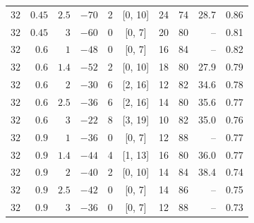 \begin{table}[t]
\begin{tabular}{rrrrrcrrrr}
$32$ & $0.45$ & $2.5$ & $-70$ & 2 & [0, 10] & 24 & 74 & 28.7 & 0.86 \\
$32$ & $0.45$ & $3$ & $-60$ & 0 & [0, 7] & 20 & 80 & -- & 0.81 \\
$32$ & $0.6$ & $1$ & $-48$ & 0 & [0, 7] & 16 & 84 & -- & 0.82 \\
$32$ & $0.6$ & $1.4$ & $-52$ & 2 & [0, 10] & 18 & 80 & 27.9 & 0.79 \\
$32$ & $0.6$ & $2$ & $-30$ & 6 & [2, 16] & 12 & 82 & 34.6 & 0.78 \\
$32$ & $0.6$ & $2.5$ & $-36$ & 6 & [2, 16] & 14 & 80 & 35.6 & 0.77 \\
$32$ & $0.6$ & $3$ & $-22$ & 8 & [3, 19] & 10 & 82 & 35.0 & 0.76 \\
$32$ & $0.9$ & $1$ & $-36$ & 0 & [0, 7] & 12 & 88 & -- & 0.77 \\
$32$ & $0.9$ & $1.4$ & $-44$ & 4 & [1, 13] & 16 & 80 & 36.0 & 0.77 \\
$32$ & $0.9$ & $2$ & $-40$ & 2 & [0, 10] & 14 & 84 & 38.4 & 0.74 \\
$32$ & $0.9$ & $2.5$ & $-42$ & 0 & [0, 7] & 14 & 86 & -- & 0.75 \\
$32$ & $0.9$ & $3$ & $-36$ & 0 & [0, 7] & 12 & 88 & -- & 0.73 \\
\bottomrule
\end{tabular}
\end{table}
